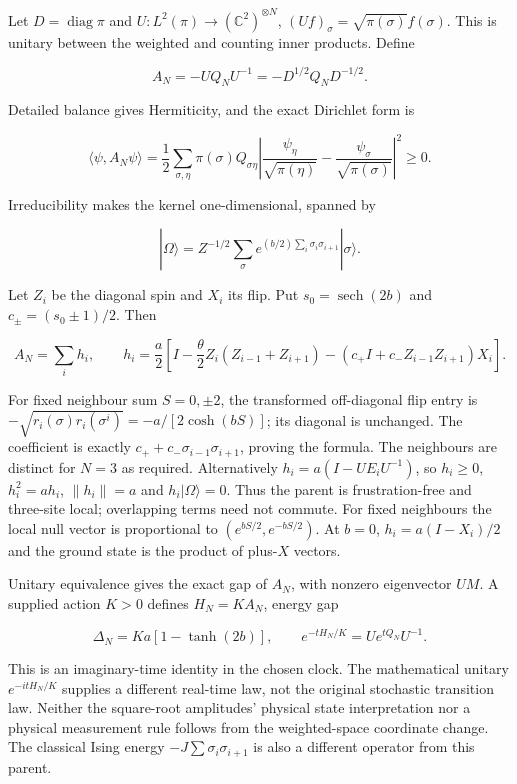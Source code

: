 \documentclass[11pt,a4paper]{article}
\begin{document}
Let \(D=\operatorname{diag}\pi\) and
\(U:L^2(\pi)\to(\mathbb C^2)^{\otimes N}\),
\((Uf)_\sigma=\sqrt{\pi(\sigma)}f(\sigma)\). This is unitary between the
weighted and counting inner products. Define

\[A_N=-UQ_NU^{-1}=-D^{1/2}Q_ND^{-1/2}.\]

Detailed balance gives Hermiticity, and the exact Dirichlet form is

\[\langle\psi,A_N\psi\rangle=\frac12\sum_{\sigma,\eta}
 \pi(\sigma)Q_{\sigma\eta}
 \left|\frac{\psi_\eta}{\sqrt{\pi(\eta)}}-
 \frac{\psi_\sigma}{\sqrt{\pi(\sigma)}}\right|^2\ge0.\]

Irreducibility makes the kernel one-dimensional, spanned by

\[|\Omega\rangle=Z^{-1/2}\sum_\sigma
 e^{(b/2)\sum_i\sigma_i\sigma_{i+1}}|\sigma\rangle.\]

Let \(Z_i\) be the diagonal spin and \(X_i\) its flip. Put
\(s_0=\operatorname{sech}(2b)\) and \(c_\pm=(s_0\pm1)/2\). Then

\[A_N=\sum_i h_i,\qquad
h_i=\frac a2\left[I-\frac\theta2Z_i(Z_{i-1}+Z_{i+1})
 -(c_+I+c_-Z_{i-1}Z_{i+1})X_i\right].\]

For fixed neighbour sum \(S=0,\pm2\), the transformed off-diagonal flip
entry is \(-\sqrt{r_i(\sigma)r_i(\sigma^i)}=-a/[2\cosh(bS)]\); its
diagonal is unchanged. The coefficient is exactly
\(c_++c_-\sigma_{i-1}\sigma_{i+1}\), proving the formula. The neighbours
are distinct for \(N=3\) as required. Alternatively
\(h_i=a(I-UE_iU^{-1})\), so \(h_i\ge0\), \(h_i^2=ah_i\), \(\|h_i\|=a\)
and \(h_i|\Omega\rangle=0\). Thus the parent is frustration-free and
three-site local; overlapping terms need not commute. For fixed
neighbours the local null vector is proportional to
\((e^{bS/2},e^{-bS/2})\). At \(b=0\), \(h_i=a(I-X_i)/2\) and the ground
state is the product of plus-\(X\) vectors.

Unitary equivalence gives the exact gap of \(A_N\), with nonzero
eigenvector \(UM\). A supplied action \(K>0\) defines \(H_N=KA_N\),
energy gap

\[\Delta_N=Ka[1-\tanh(2b)],\qquad
 e^{-tH_N/K}=Ue^{tQ_N}U^{-1}.\]

This is an imaginary-time identity in the chosen clock. The mathematical
unitary \(e^{-itH_N/K}\) supplies a different real-time law, not the
original stochastic transition law. Neither the square-root amplitudes'
physical state interpretation nor a physical measurement rule follows
from the weighted-space coordinate change. The classical Ising energy
\(-J\sum\sigma_i\sigma_{i+1}\) is also a different operator from this
parent.
\end{document}
